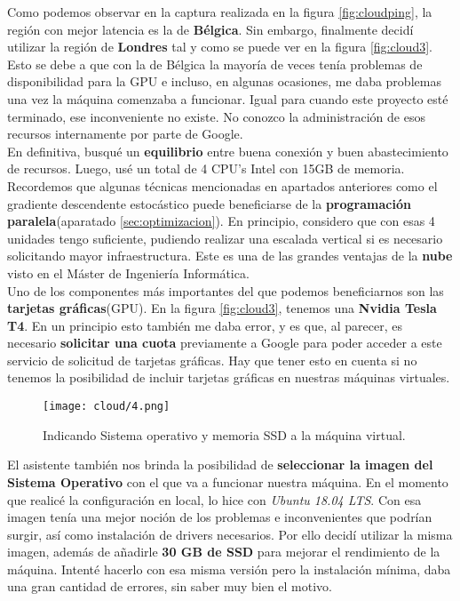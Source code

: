 \documentclass[11pt,fleqn]{book} %
\begin{document}
Como podemos observar en la captura realizada en la figura \ref{fig:cloudping}, la región con mejor latencia es la de \textbf{Bélgica}. Sin embargo, finalmente decidí utilizar la región de \textbf{Londres} tal y como se puede ver en la figura \ref{fig:cloud3}. Esto se debe a que con la de Bélgica la mayoría de veces tenía problemas de disponibilidad para la GPU e incluso, en algunas ocasiones, me daba problemas una vez la máquina comenzaba a funcionar. Igual para cuando este proyecto esté terminado, ese inconveniente no existe. No conozco la administración de esos recursos internamente por parte de Google. \\

En definitiva, busqué un \textbf{equilibrio} entre buena conexión y buen abastecimiento de recursos. Luego, usé un total de 4 CPU's Intel con 15GB de memoria. Recordemos que algunas técnicas mencionadas en apartados anteriores como el gradiente descendente estocástico puede beneficiarse de la \textbf{programación paralela}(aparatado \ref{sec:optimizacion}). En principio, considero que con esas 4 unidades tengo suficiente, pudiendo realizar una escalada vertical si es necesario solicitando mayor infraestructura. Este es una de las grandes ventajas de la \textbf{nube} visto en el Máster de Ingeniería Informática. \\

Uno de los componentes más importantes del que podemos beneficiarnos son las \textbf{tarjetas gráficas}(GPU). En la figura \ref{fig:cloud3}, tenemos una \textbf{Nvidia Tesla T4}. En un principio esto también me daba error, y es que, al parecer, es necesario \textbf{solicitar una cuota} previamente a Google para poder acceder a este servicio de solicitud de tarjetas gráficas. Hay que tener esto en cuenta si no tenemos la posibilidad de incluir tarjetas gráficas en nuestras máquinas virtuales.\cite{article:cuota} \\

\begin{figure}[H]
	\centering\texttt{[image: cloud/4.png]}
	\caption{Indicando Sistema operativo y memoria SSD a la máquina virtual.}
	\label{fig:cloud4} %
\end{figure} 

El asistente también nos brinda la posibilidad de \textbf{seleccionar la imagen del Sistema Operativo} con el que va a funcionar nuestra máquina. En el momento que realicé la configuración en local, lo hice con \textit{Ubuntu 18.04 LTS}. Con esa imagen tenía una mejor noción de los problemas e inconvenientes que podrían surgir, así como instalación de drivers necesarios. Por ello decidí utilizar la misma imagen, además de añadirle \textbf{30 GB de SSD} para mejorar el rendimiento de la máquina. Intenté hacerlo con esa misma versión pero la instalación mínima, daba una gran cantidad de errores, sin saber muy bien el motivo. \\
\end{document}
